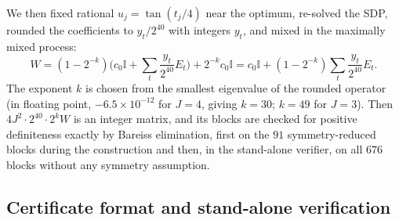 \documentclass[aps,pra,onecolumn,notitlepage,superscriptaddress,longbibliography,nofootinbib,11pt]{revtex4-2}
\theoremstyle{remark}
\newcommand{\one}{\mathbb{I}}
\begin{document}
We then fixed rational $u_j=\tan(t_j/4)$ near the optimum, re-solved the SDP, rounded the coefficients to $y_t/2^{40}$ with integers $y_t$, and mixed in the maximally mixed process:
\begin{equation}
W=(1-2^{-k})\Big(c_0\one+\sum_t\frac{y_t}{2^{40}}E_t\Big)+2^{-k}c_0\one
=c_0\one+(1-2^{-k})\sum_t\frac{y_t}{2^{40}}E_t .
\end{equation}
The exponent $k$ is chosen from the smallest eigenvalue of the rounded operator (in floating point, $-6.5\times10^{-12}$ for $J=4$, giving $k=30$; $k=49$ for $J=3$). Then $4J^2\cdot2^{40}\cdot2^kW$ is an integer matrix, and its blocks are checked for positive definiteness exactly by Bareiss elimination, first on the $91$ symmetry-reduced blocks during the construction and then, in the stand-alone verifier, on all $676$ blocks without any symmetry assumption.

\subsection{Certificate format and stand-alone verification}\label{sec:strat-verify}
\end{document}
